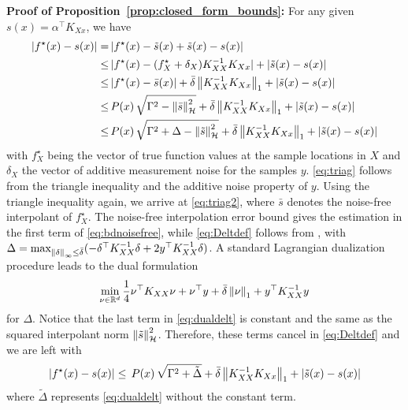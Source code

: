 \begin{my_proof}
	\textbf{Proof of Proposition~\ref{prop:closed_form_bounds}:}
	For any given $s(x)=\alpha^\top K_{Xx}$, we have 
	\begin{align}\notag
		\vert f^\star(x) -s(x)\vert =& \, \vert f^\star(x) -\tilde{s}(x) + \tilde{s}(x)-s(x)\vert \\
		\le& \, \vert f^\star(x) - (f^\star_X + \delta_X) K_{XX}^{-1}K_{Xx}\vert + \vert  \tilde{s}(x)-s(x)\vert \label{eq:triag}\\
		\le& \, \vert f^\star(x) - \bar s(x)\vert + \bar \delta \left\| K_{XX}^{-1}K_{Xx} \right\|_1 + \vert  \tilde{s}(x)-s(x)\vert \label{eq:triag2}\\
		\le& \, P(x) \, \sqrt{ \Gamma^2  - \left\| \bar{s} \right\|_\mathcal{H}^2} + \bar \delta \left\| K_{XX}^{-1}K_{Xx} \right\|_1 + \vert  \tilde{s}(x)-s(x)\vert \label{eq:bdnoisefree}\\
		\le& \, P(x) \, \sqrt{ \Gamma^2 + \Delta - \left\| \tilde{s} \right\|_\mathcal{H}^2} + \bar \delta \left\| K_{XX}^{-1}K_{Xx} \right\|_1 + \vert  \tilde{s}(x)-s(x)\vert \label{eq:Deltdef}
	\end{align}
	with $f^\star_X$ being the vector of true function values at the sample locations in $X$ and $\delta_X$ the vector of additive measurement noise for the samples $y$. \eqref{eq:triag} follows from the triangle inequality and the additive noise property of $y$. Using the triangle inequality again, we arrive at \eqref{eq:triag2}, where $\bar s$ denotes the noise-free interpolant of $f^\star_X$. The noise-free interpolation error bound gives the estimation in the first term of \eqref{eq:bdnoisefree}, while \eqref{eq:Deltdef} follows from \cite[Lemma~1]{maddalena2021deterministic}, with $\Delta = \max_{\left\| \delta \right\|_\infty \leq \bar{\delta}} (- \delta^\top K_{XX}^{-1} \delta + 2 y ^\top K_{XX}^{-1} \delta)$. A standard Lagrangian dualization procedure leads to the dual formulation
	\begin{equation}
		\label{eq:dualdelt}
		\min_{\nu \in \mathbb{R}^d} \frac{1}{4} \nu^\top K_{XX} \nu + \nu^\top y + \bar{\delta} \left\| \nu \right\|_1 + y^\top K_{XX}^{-1} y
	\end{equation}
	for $\Delta$. Notice that the last term in \eqref{eq:dualdelt} is constant and the same as the squared interpolant norm $\left\| \tilde{s} \right\|_\mathcal{H}^2$. Therefore, these terms cancel in \eqref{eq:Deltdef} and we are left with
	\begin{equation}
			\vert f^\star(x)-s(x)\vert  \le \, P(x) \, \sqrt{ \Gamma^2 + \tilde\Delta} + \bar \delta \left\| K_{XX}^{-1}K_{Xx} \right\|_1 + \vert  \tilde{s}(x)-s(x)\vert
	\end{equation}
	where $\tilde{\Delta}$ represents \eqref{eq:dualdelt} without the constant term.
\end{my_proof}

